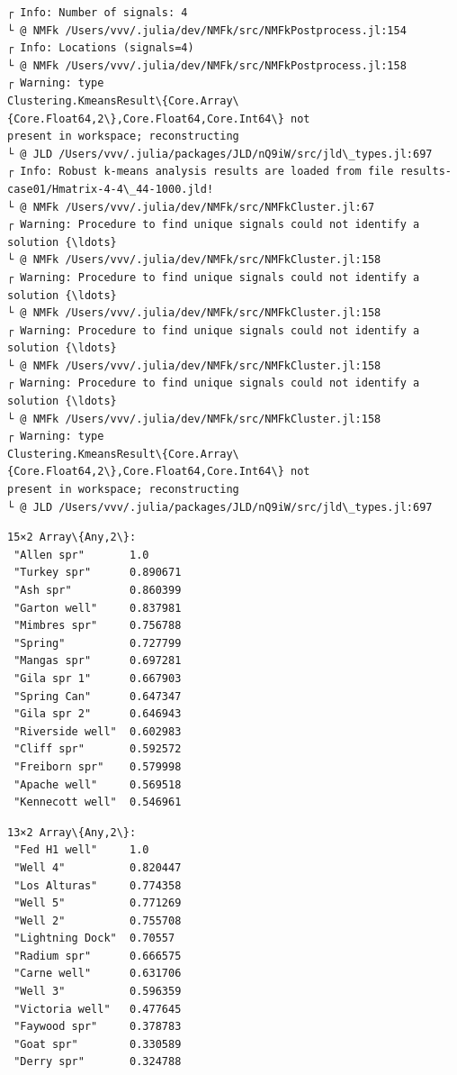 \documentclass[11pt]{article}
\begin{document}
    \begin{Verbatim}[commandchars=\\\{\}]
┌ Info: Number of signals: 4
└ @ NMFk /Users/vvv/.julia/dev/NMFk/src/NMFkPostprocess.jl:154
┌ Info: Locations (signals=4)
└ @ NMFk /Users/vvv/.julia/dev/NMFk/src/NMFkPostprocess.jl:158
┌ Warning: type
Clustering.KmeansResult\{Core.Array\{Core.Float64,2\},Core.Float64,Core.Int64\} not
present in workspace; reconstructing
└ @ JLD /Users/vvv/.julia/packages/JLD/nQ9iW/src/jld\_types.jl:697
┌ Info: Robust k-means analysis results are loaded from file results-
case01/Hmatrix-4-4\_44-1000.jld!
└ @ NMFk /Users/vvv/.julia/dev/NMFk/src/NMFkCluster.jl:67
┌ Warning: Procedure to find unique signals could not identify a solution {\ldots}
└ @ NMFk /Users/vvv/.julia/dev/NMFk/src/NMFkCluster.jl:158
┌ Warning: Procedure to find unique signals could not identify a solution {\ldots}
└ @ NMFk /Users/vvv/.julia/dev/NMFk/src/NMFkCluster.jl:158
┌ Warning: Procedure to find unique signals could not identify a solution {\ldots}
└ @ NMFk /Users/vvv/.julia/dev/NMFk/src/NMFkCluster.jl:158
┌ Warning: Procedure to find unique signals could not identify a solution {\ldots}
└ @ NMFk /Users/vvv/.julia/dev/NMFk/src/NMFkCluster.jl:158
┌ Warning: type
Clustering.KmeansResult\{Core.Array\{Core.Float64,2\},Core.Float64,Core.Int64\} not
present in workspace; reconstructing
└ @ JLD /Users/vvv/.julia/packages/JLD/nQ9iW/src/jld\_types.jl:697
    \end{Verbatim}

    
    \begin{Verbatim}[commandchars=\\\{\}]
15×2 Array\{Any,2\}:
 "Allen spr"       1.0
 "Turkey spr"      0.890671
 "Ash spr"         0.860399
 "Garton well"     0.837981
 "Mimbres spr"     0.756788
 "Spring"          0.727799
 "Mangas spr"      0.697281
 "Gila spr 1"      0.667903
 "Spring Can"      0.647347
 "Gila spr 2"      0.646943
 "Riverside well"  0.602983
 "Cliff spr"       0.592572
 "Freiborn spr"    0.579998
 "Apache well"     0.569518
 "Kennecott well"  0.546961
    \end{Verbatim}

    
    
    \begin{Verbatim}[commandchars=\\\{\}]
13×2 Array\{Any,2\}:
 "Fed H1 well"     1.0
 "Well 4"          0.820447
 "Los Alturas"     0.774358
 "Well 5"          0.771269
 "Well 2"          0.755708
 "Lightning Dock"  0.70557
 "Radium spr"      0.666575
 "Carne well"      0.631706
 "Well 3"          0.596359
 "Victoria well"   0.477645
 "Faywood spr"     0.378783
 "Goat spr"        0.330589
 "Derry spr"       0.324788
    \end{Verbatim}
\end{document}

